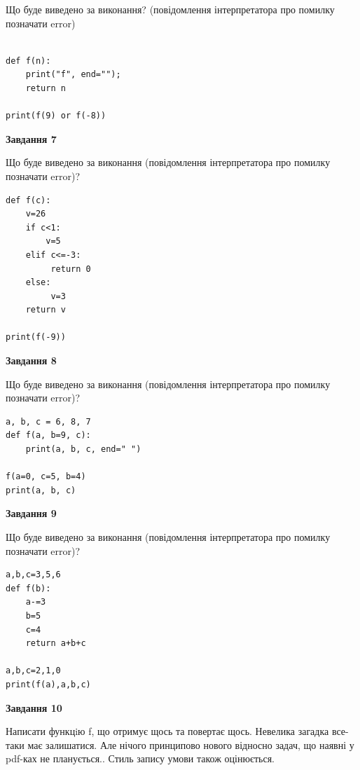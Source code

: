 \documentclass[12pt, ukrainian]{article}
\begin{document}
{\begin {large}
Що буде виведено за виконання? (повідомлення інтерпретатора про помилку позначати error)\par
\begin{verbatim}

def f(n):
    print("f", end="");
    return n

print(f(9) or f(-8))
\end{verbatim}

{\begin {center}\textbf{Завдання 7}\end {center}}

Що буде виведено за виконання (повідомлення інтерпретатора про помилку позначати error)?\par
\begin{verbatim}
def f(c):
    v=26
    if c<1: 
        v=5
    elif c<=-3:
         return 0
    else:
         v=3
    return v

print(f(-9))
\end{verbatim}

{\begin {center}\textbf{Завдання 8}\end {center}}

Що буде виведено за виконання (повідомлення інтерпретатора про помилку позначати error)?\par
\begin{verbatim}
a, b, c = 6, 8, 7
def f(a, b=9, c):
    print(a, b, c, end=" ")

f(a=0, c=5, b=4)
print(a, b, c)
\end{verbatim}

{\begin {center}\textbf{Завдання 9}\end {center}}

Що буде виведено за виконання (повідомлення інтерпретатора про помилку позначати error)?\par
\begin{verbatim}
a,b,c=3,5,6
def f(b):
    a-=3
    b=5
    c=4
    return a+b+c

a,b,c=2,1,0
print(f(a),a,b,c)
\end{verbatim}

{\begin {center}\textbf{Завдання 10}\end {center}}


Написати функцiю f, що отримує щось та повертає щось. Невелика загадка все-таки має залишатися. Але нічого принципово нового відносно задач, що наявні у pdf-ках не планується.. Стиль запису умови також оцінюється.\par
\end {large}}
\newpage
\end{document}
